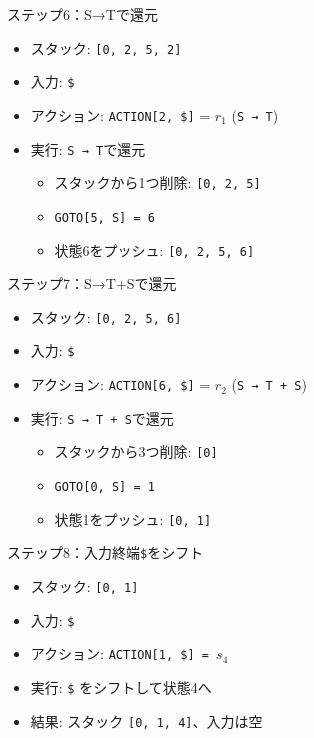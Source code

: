 ステップ6：S→Tで還元

\begin{itemize}
\item
  スタック: \texttt{{[}0,\ 2,\ 5,\ 2{]}}
\item
  入力: \texttt{\$}
\item
  アクション: \texttt{ACTION{[}2,\ \${]}} = \(r_1\) (\texttt{S\ →\ T})
\item
  実行: \texttt{S\ →\ T}で還元

  \begin{itemize}
  \item
    スタックから1つ削除: \texttt{{[}0,\ 2,\ 5{]}}
  \item
    \texttt{GOTO{[}5,\ S{]}\ =\ 6}
  \item
    状態6をプッシュ: \texttt{{[}0,\ 2,\ 5,\ 6{]}}
  \end{itemize}
\end{itemize}

ステップ7：S→T+Sで還元

\begin{itemize}
\item
  スタック: \texttt{{[}0,\ 2,\ 5,\ 6{]}}
\item
  入力: \texttt{\$}
\item
  アクション: \texttt{ACTION{[}6,\ \${]}} = \(r_2\)
  (\texttt{S\ →\ T\ +\ S})
\item
  実行: \texttt{S\ →\ T\ +\ S}で還元

  \begin{itemize}
  \item
    スタックから3つ削除: \texttt{{[}0{]}}
  \item
    \texttt{GOTO{[}0,\ S{]}\ =\ 1}
  \item
    状態1をプッシュ: \texttt{{[}0,\ 1{]}}
  \end{itemize}
\end{itemize}

ステップ8：入力終端\texttt{\$}をシフト

\begin{itemize}
\item
  スタック: \texttt{{[}0,\ 1{]}}
\item
  入力: \texttt{\$}
\item
  アクション: \texttt{ACTION{[}1,\ \${]}\ =\ \(s_4\)}
\item
  実行: \texttt{\$} をシフトして状態4へ
\item
  結果: スタック \texttt{{[}0,\ 1,\ 4{]}}、入力は空
\end{itemize}

